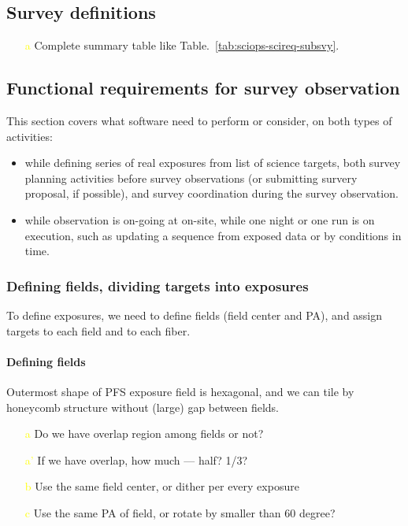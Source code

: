 \documentclass[a4paper,notitlepage]{article}
\newcommand{\colm}[1]{\textcolor{yellow}{#1}}
\begin{document}
\subsection{Survey definitions}

\begin{enumerate}
  \item[\colm{a}] Complete summary table like Table.~\ref{tab:sciops-scireq-subsvy}.
\end{enumerate}

\subsection{Functional requirements for survey observation}

This section covers what software need to perform or consider, 
on both types of activities: 
\begin{itemize}
  \item while defining series of real exposures from list of science targets, 
    both survey planning activities before survey observations (or submitting 
    survery proposal, if possible), and survey coordination during the survey 
    observation. 
  \item while observation is on-going at on-site, while one night or one run 
    is on execution, such as updating a sequence from exposed data or by 
    conditions in time. 
\end{itemize}

\subsubsection{Defining fields, dividing targets into exposures}

To define exposures, we need to define fields (field center and PA), and 
assign targets to each field and to each fiber. 

\paragraph{Defining fields}

Outermost shape of PFS exposure field is hexagonal, and we can tile by 
honeycomb structure without (large) gap between fields. 

\begin{enumerate}
  \item[\colm{a}] Do we have overlap region among fields or not?
  \item[\colm{a'}] If we have overlap, how much --- half? 1/3?
  \item[\colm{b}] Use the same field center, or dither per every exposure
  \item[\colm{c}] Use the same PA of field, or rotate by smaller than 60 degree?
\end{enumerate}
\end{document}
